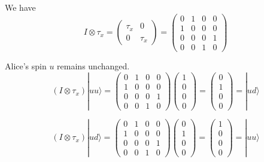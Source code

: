 


\bigskip
We have
\begin{equation*}
I\otimes\tau_x
=\begin{pmatrix}\tau_x&0\\0&\tau_x\end{pmatrix}
=\begin{pmatrix}0&1&0&0\\1&0&0&0\\0&0&0&1\\0&0&1&0\end{pmatrix}
\end{equation*}

Alice's spin $u$ remains unchanged.
\begin{equation*}
(I\otimes\tau_x)|uu\rangle
=\begin{pmatrix}0&1&0&0\\1&0&0&0\\0&0&0&1\\0&0&1&0\end{pmatrix}
\begin{pmatrix}1\\0\\0\\0\end{pmatrix}
=\begin{pmatrix}0\\1\\0\\0\end{pmatrix}=|ud\rangle
\end{equation*}

\begin{equation*}
(I\otimes\tau_x)|ud\rangle
=\begin{pmatrix}0&1&0&0\\1&0&0&0\\0&0&0&1\\0&0&1&0\end{pmatrix}
\begin{pmatrix}0\\1\\0\\0\end{pmatrix}
=\begin{pmatrix}1\\0\\0\\0\end{pmatrix}=|uu\rangle
\end{equation*}

